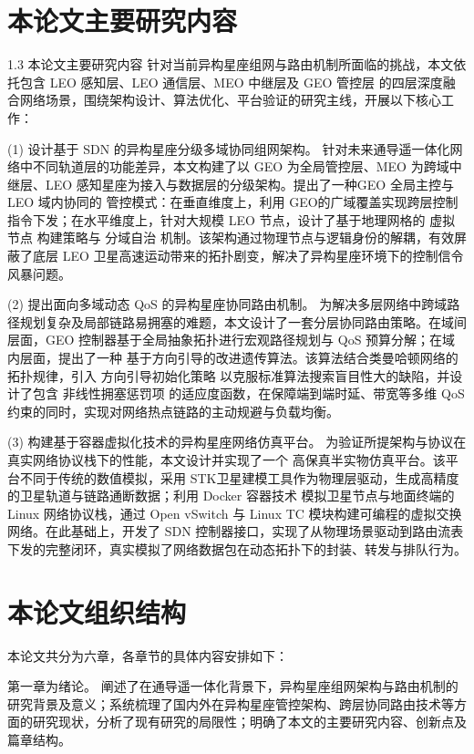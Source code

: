 \documentclass[print, master, vlined]{DissertUESTC}
\begin{document}
    \section{本论文主要研究内容}
    1.3 本论文主要研究内容
    针对当前异构星座组网与路由机制所面临的挑战，本文依托包含 LEO 感知层、LEO 通信层、MEO 中继层及 GEO 管控层 的四层深度融合网络场景，围绕架构设计、算法优化、平台验证的研究主线，开展以下核心工作：
    
    (1) 设计基于 SDN 的异构星座分级多域协同组网架构。 针对未来通导遥一体化网络中不同轨道层的功能差异，本文构建了以 GEO 为全局管控层、MEO 为跨域中继层、LEO 感知星座为接入与数据层的分级架构。提出了一种GEO 全局主控与LEO 域内协同的 管控模式：在垂直维度上，利用 GEO的广域覆盖实现跨层控制指令下发；在水平维度上，针对大规模 LEO 节点，设计了基于地理网格的 虚拟节点 构建策略与 分域自治 机制。该架构通过物理节点与逻辑身份的解耦，有效屏蔽了底层 LEO 卫星高速运动带来的拓扑剧变，解决了异构星座环境下的控制信令风暴问题。
    
    (2) 提出面向多域动态 QoS 的异构星座协同路由机制。 为解决多层网络中跨域路径规划复杂及局部链路易拥塞的难题，本文设计了一套分层协同路由策略。在域间层面，GEO 控制器基于全局抽象拓扑进行宏观路径规划与 QoS 预算分解；在域内层面，提出了一种 基于方向引导的改进遗传算法。该算法结合类曼哈顿网络的拓扑规律，引入 方向引导初始化策略 以克服标准算法搜索盲目性大的缺陷，并设计了包含 非线性拥塞惩罚项 的适应度函数，在保障端到端时延、带宽等多维 QoS 约束的同时，实现对网络热点链路的主动规避与负载均衡。
    
    (3) 构建基于容器虚拟化技术的异构星座网络仿真平台。 为验证所提架构与协议在真实网络协议栈下的性能，本文设计并实现了一个 高保真半实物仿真平台。该平台不同于传统的数值模拟，采用 STK卫星建模工具作为物理层驱动，生成高精度的卫星轨道与链路通断数据；利用 Docker 容器技术 模拟卫星节点与地面终端的 Linux 网络协议栈，通过 Open vSwitch  与 Linux TC 模块构建可编程的虚拟交换网络。在此基础上，开发了 SDN 控制器接口，实现了从物理场景驱动到路由流表下发的完整闭环，真实模拟了网络数据包在动态拓扑下的封装、转发与排队行为。
    
    \section{本论文组织结构}

    本论文共分为六章，各章节的具体内容安排如下：

    第一章为绪论。 阐述了在通导遥一体化背景下，异构星座组网架构与路由机制的研究背景及意义；系统梳理了国内外在异构星座管控架构、跨层协同路由技术等方面的研究现状，分析了现有研究的局限性；明确了本文的主要研究内容、创新点及篇章结构。
    
\end{document}
